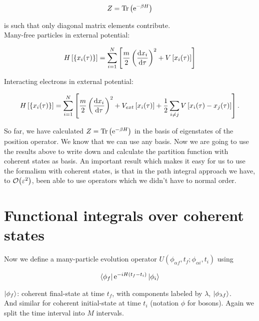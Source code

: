 \begin{equation*}
    Z = \Tr \left( \mathrm{e}^{-\beta H} \right)
\end{equation*}

is such that only diagonal matrix elements contribute. \\ 

Many-free particles in external potential: 

\begin{equation*}
    H\left[\{x_{i}(\tau)\}\right] = \sum_{i=1}^{N} \left[ \frac{m}{2} \left(\dv{x_{i}}{\tau}\right)^{2} + V\left[x_{i}(\tau)\right] \right]
\end{equation*}

Interacting electrons in external potential: 

\begin{equation*}
    H\left[\{x_{i}(\tau)\}\right] = \sum_{i=1}^{N} \left[ \frac{m}{2} \left(\dv{x_{i}}{\tau}\right)^{2} + V_{ext}\left[x_{i}(\tau)\right] + \frac{1}{2}\sum_{i\neq j} V\left[x_{i}(\tau) - x_{j}(\tau)\right] \right].
\end{equation*}

So far, we have calculated $Z = \Tr \left( \mathrm{e}^{-\beta H} \right)$ in the basis of eigenstates of the position operator. We know that we can use any basis. Now we are going to use the results above to write down and calculate the partition function with coherent states as basis. An important result which makes it easy for us to use the formalism with coherent states, is that in the path integral approach we have, to $\order{\varepsilon^{2}}$, been able to use operators which we didn't have to normal order. 

\section{Functional integrals over coherent states}

Now we define a many-particle evolution operator $U(\phi_{\alpha f}, t_{f}; \phi_{\alpha i}, t_{i})$ using 

\begin{equation*}
    \bra{\phi_{f}} \mathrm{e}^{-iH(t_{f} - t_{i})} \ket{\phi_{i}}
\end{equation*}

$\ket{\phi_{f}}$: coherent final-state at time $t_{f}$, with components labeled by $\lambda$, $\ket{\phi_{\lambda f}}$. \\

And similar for coherent initial-state at time $t_{i}$ (notation $\phi$ for bosons). Again we split the time interval into $M$ intervals. 

